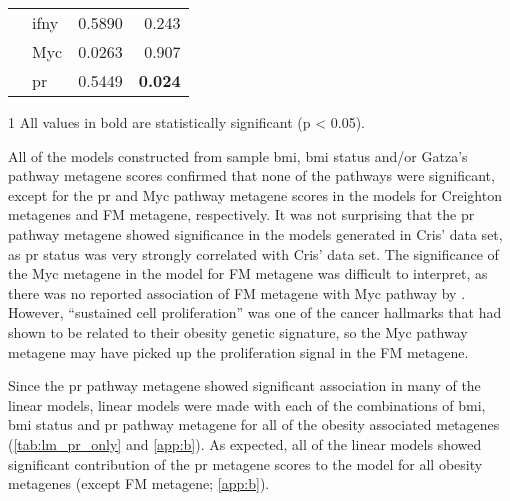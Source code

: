\begin{table}[htpb]
\begin{threeparttable}
\begin{tabular}{llrr}
                                                                       & \gls{ifny} & 0.5890  & 0.243\\
                                                                       & Myc        & 0.0263  & 0.907\\
                                                                       & \gls{pr}   & 0.5449  & \textbf{0.024}\\
			\hline
			\hline
		\end{tabular}
		\begin{tablenotes}
			\item [1] All values in bold are statistically significant (p \textless{} 0.05).
		\end{tablenotes}
	\end{threeparttable}
\end{table}

All of the models constructed from sample \gls{bmi}, \gls{bmi} status and/or Gatza's pathway metagene scores confirmed that none of the pathways were significant, except for the \gls{pr} and Myc pathway metagene scores in the models for Creighton metagenes and FM metagene, respectively.
It was not surprising that the \gls{pr} pathway metagene showed significance in the models generated in Cris' data set, as \gls{pr} status was very strongly correlated with Cris' data set.
The significance of the Myc metagene in the model for FM metagene was difficult to interpret, as there was no reported association of FM metagene with Myc pathway by \citet{Fuentes-Mattei2014}.
However, ``sustained cell proliferation'' was one of the cancer hallmarks that \citet{Fuentes-Mattei2014} had shown to be related to their obesity genetic signature, so the Myc pathway metagene may have picked up the proliferation signal in the FM metagene.

Since the \gls{pr} pathway metagene showed significant association in many of the linear models, linear models were made with each of the combinations of \gls{bmi}, \gls{bmi} status and \gls{pr} pathway metagene for all of the obesity associated metagenes (\cref{tab:lm_pr_only} and \cref{app:b}).
As expected, all of the linear models showed significant contribution of the \gls{pr} metagene scores to the model for all obesity metagenes (except FM metagene; \cref{app:b}).

